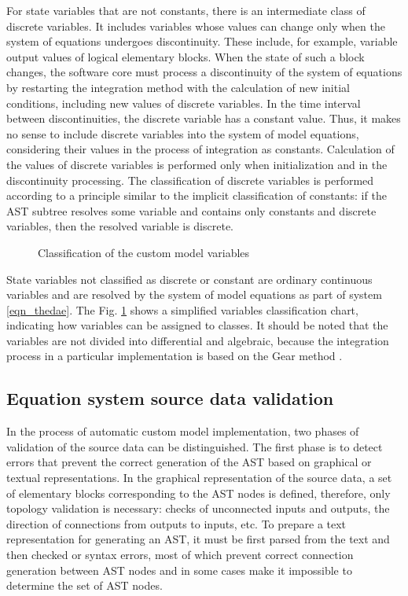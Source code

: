\documentclass[lettersize,journal]{IEEEtran}
\begin{document}
For state variables that are not constants, there is an intermediate class of discrete variables. It includes variables whose 
values can change only when the system of equations undergoes discontinuity. These include, for example, variable output values of
logical elementary blocks. When the state of such a block changes, the software core must process a
discontinuity of the system of equations by restarting the integration method with the calculation of new initial conditions,
including new values of discrete variables. In the time interval between discontinuities, the discrete variable has a constant
value. Thus, it makes no sense to include discrete variables into the system of model equations, considering their values in the
process of integration as constants. Calculation of the values of discrete variables is performed only when initialization and in
the discontinuity processing. The classification of discrete variables is performed according to a principle similar 
to the implicit classification of constants: if the AST subtree resolves some variable and contains only constants and discrete
variables, then the resolved variable is discrete.

\begin{figure}[h]
	\centering
	\caption{Classification of the custom model variables}
	\label{fig_vars}
\end{figure}

State variables not classified as discrete or constant are ordinary continuous variables and are resolved by the system of model
equations as part of system \eqref{eqn_thedae}. The Fig. \ref{fig_vars} shows a simplified variables classification chart,
indicating how variables can be assigned to classes. 
It should be noted that the variables are not divided into differential and algebraic, because the 
integration process in a particular implementation is based on the Gear method \cite{texbook}.

\subsection {Equation system source data validation} \label{sec_validation}

In the process of automatic custom model implementation, two phases of validation of the source data can be distinguished. 
The first phase is to detect errors that prevent the correct generation of the AST based on graphical or textual representations. 
In the graphical representation of the source data, a set of elementary blocks corresponding to the AST nodes is defined,
therefore, only topology validation is necessary: checks of unconnected inputs and outputs, the direction of connections from
outputs to inputs, etc. To prepare a text representation for generating an AST, it must be first parsed from the text 
and then checked or syntax errors, most of which prevent correct connection generation between AST nodes and in some cases 
make it impossible to determine the set of AST nodes.
\end{document}
